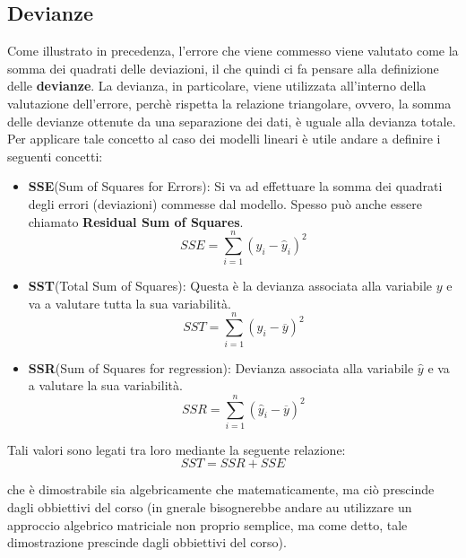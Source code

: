 \subsection{Devianze}
Come illustrato in precedenza, l'errore che viene commesso viene valutato come la somma dei quadrati delle deviazioni, il che quindi ci fa pensare alla definizione delle \textbf{devianze}. La devianza, in particolare, viene utilizzata all'interno della valutazione dell'errore, perchè rispetta la relazione triangolare, ovvero, la somma delle devianze ottenute da una separazione dei dati, è uguale alla devianza totale. Per applicare tale concetto al caso dei modelli lineari è utile andare a definire i seguenti concetti:
\begin{itemize}
    \item \textbf{SSE}(Sum of Squares for Errors): Si va ad effettuare la somma dei quadrati degli errori (deviazioni) commesse dal modello. Spesso può anche essere chiamato \textbf{Residual Sum of Squares}.
    \[
    SSE = \sum_{i=1}^{n}(y_i - \hat{y}_i)^2
    \]

    \item \textbf{SST}(Total Sum of Squares): Questa è la devianza associata alla variabile \(y\) e va a valutare tutta la sua variabilità.
    \[
    SST = \sum_{i=1}^{n}(y_i - \overline{y})^2
    \]

    \item \textbf{SSR}(Sum of Squares for regression): Devianza associata alla variabile \(\hat{y}\) e va a valutare la sua variabilità.
    \[
    SSR = \sum_{i=1}^{n}(\hat{y}_i - \overline{y})^2
    \]
\end{itemize}

Tali valori sono legati tra loro mediante la seguente relazione:
\[
SST = SSR + SSE
\]

che è dimostrabile sia algebricamente che matematicamente, ma ciò prescinde dagli obbiettivi del corso (in gnerale bisognerebbe andare au utilizzare un approccio algebrico matriciale non proprio semplice, ma come detto, tale dimostrazione prescinde dagli obbiettivi del corso).

